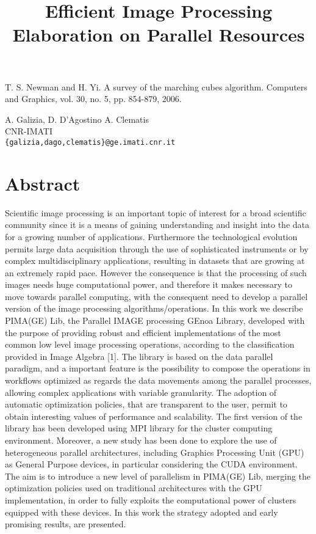 \documentclass[article,A4,11pt]{llncs}%
\begin{document}

\begin{thebibliography}{10}
{\sc T. S. Newman and H. Yi}. {A survey of the marching cubes algorithm}. Computers and Graphics, vol. 30, no. 5, pp. 854-879, 2006.
\end{thebibliography}

\title{Efficient Image Processing Elaboration on Parallel Resources}
 \author{} \institute{}
\maketitle
\begin{center}
{\large A. Galizia, D. D'Agostino A. Clematis}\\
CNR-IMATI\\
{\tt \{galizia,dago,clematis\}@ge.imati.cnr.it}
\end{center}

\section*{Abstract}
Scientific image processing is an important topic of interest for a broad scientific community since it is a means of gaining understanding and insight into the data for a growing number of applications. Furthermore the technological evolution permits large data acquisition through the use of sophisticated instruments or by complex multidisciplinary applications, resulting in datasets that are growing at an extremely rapid pace. However the consequence is that the processing of such images needs huge computational power, and therefore it makes necessary to move towards parallel computing, with the consequent need to develop a parallel version of the image processing algorithms/operations. 
In this work we describe PIMA(GE) Lib, the Parallel IMAGE processing GEnoa Library, developed with the purpose of providing robust and efficient implementations of the most common low level image processing operations, according to the classification provided in Image Algebra [1]. The library is based on the data parallel paradigm, and a important feature is the possibility to compose the operations in workflows optimized as regards the data movements among the parallel processes, allowing complex applications with variable granularity. The adoption of automatic optimization policies, that are transparent to the user, permit to obtain interesting values of performance and scalability.  The first version of the library has been developed using MPI library for the cluster computing environment. 
Moreover, a new study has been done to explore the use of heterogeneous parallel architectures, including Graphics Processing Unit (GPU) as General Purpose devices, in particular considering the CUDA environment. The aim is to introduce a  new level of parallelism in PIMA(GE) Lib, merging the optimization policies used on traditional architectures with the GPU implementation, in order to fully exploits the computational power of clusters equipped with these devices.  In this work the strategy adopted and early promising results, are presented. 
\end{document}
